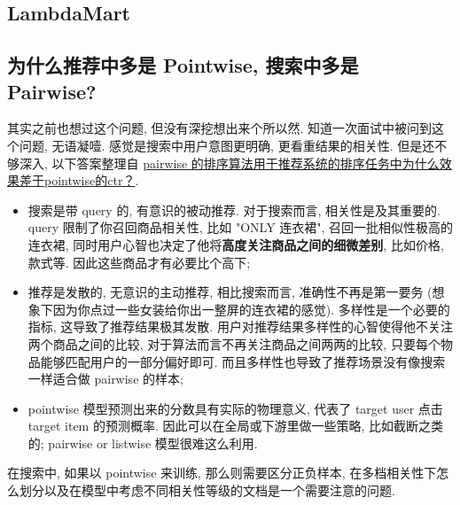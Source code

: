 \subsection{LambdaMart}


\subsection{为什么推荐中多是 Pointwise, 搜索中多是 Pairwise?}
其实之前也想过这个问题, 但没有深挖想出来个所以然. 知道一次面试中被问到这个问题, 无语凝噎. 感觉是搜索中用户意图更明确, 更看重结果的相关性. 但是还不够深入, 以下答案整理自 \href{pairwise 的排序算法用于推荐系统的排序任务中为什么效果差于pointwise的ctr？ - 忆丶昔的回答 - 知乎
	https://www.zhihu.com/question/338044033/answer/815202813}{pairwise 的排序算法用于推荐系统的排序任务中为什么效果差于pointwise的ctr？}.

\begin{itemize}
	\item 搜索是带 query 的, 有意识的被动推荐. 对于搜索而言, 相关性是及其重要的. query 限制了你召回商品相关性, 比如 "ONLY 连衣裙", 召回一批相似性极高的连衣裙, 同时用户心智也决定了他将\textbf{高度关注商品之间的细微差别}, 比如价格, 款式等. 因此这些商品才有必要比个高下;
	
	\item 推荐是发散的, 无意识的主动推荐, 相比搜索而言, 准确性不再是第一要务 (想象下因为你点过一些女装给你出一整屏的连衣裙的感觉). 多样性是一个必要的指标, 这导致了推荐结果极其发散. 用户对推荐结果多样性的心智使得他不关注两个商品之间的比较, 对于算法而言不再关注商品之间两两的比较, 只要每个物品能够匹配用户的一部分偏好即可. 而且多样性也导致了推荐场景没有像搜索一样适合做 pairwise 的样本;
	
	\item pointwise 模型预测出来的分数具有实际的物理意义, 代表了 target user 点击 target item 的预测概率. 因此可以在全局或下游里做一些策略, 比如截断之类的; pairwise or listwise 模型很难这么利用.
\end{itemize}

在搜索中, 如果以 pointwise 来训练, 那么则需要区分正负样本, 在多档相关性下怎么划分以及在模型中考虑不同相关性等级的文档是一个需要注意的问题. 